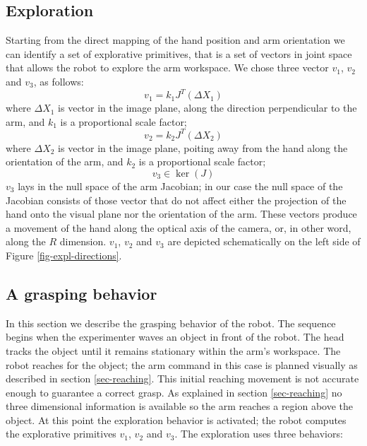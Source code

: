 \subsection{Exploration}
Starting from the direct mapping of the hand position and arm orientation we 
can identify a set of explorative primitives, that is a set of vectors in 
joint space that allows the robot to explore the arm workspace. We chose three 
vector $v_1$, $v_2$ and $v_3$, as follows:
\begin{equation}
  v_1=k_1J^T\left(\Delta X_1\right)
\end{equation}
where $\Delta X_1$ is vector in the image plane, along the direction 
perpendicular to the arm, and $k_1$ is a proportional scale factor;
\begin{equation}
  v_2=k_2J^T\left(\Delta X_2\right)
\end{equation}
where $\Delta X_2$ is vector in the image plane, poiting away from the hand 
along the orientation of the arm, and $k_2$ is a proportional scale factor;
\begin{equation}
 v_3\in \ker \left(J\right)
\end{equation}
$v_3$ lays in the null space of the arm Jacobian; in our case the 
null space of the Jacobian consists of those vector that do not affect 
either the projection of the hand onto the visual plane nor the orientation 
of the arm. These vectors produce a movement of the hand along the optical 
axis of the camera, or, in other word, along the $R$ dimension.
$v_1$, $v_2$ and $v_3$ are depicted schematically on the left side of 
Figure \ref{fig-expl-directions}.

\subsection{A grasping behavior}
In this section we describe the grasping behavior of the robot. The 
sequence begins when the experimenter waves an object in front of the 
robot. The head tracks the object until it remains stationary within 
the arm's workspace. The robot reaches for the object; the arm 
command in this case is planned visually as described in section 
\ref{sec-reaching}. This initial reaching movement is not accurate enough 
to guarantee a correct grasp. As explained in section \ref{sec-reaching} no 
three dimensional information is available so the arm reaches a region 
above the object. At this point the exploration behavior is activated; the 
robot computes the explorative primitives $v_1$, $v_2$ and $v_3$. The 
exploration uses three behaviors:

